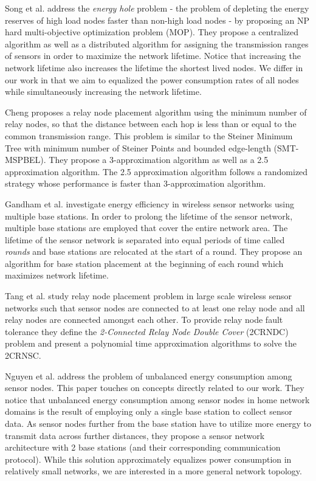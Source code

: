 Song et al. \cite{Song2009} address the \textit{energy hole} problem - the problem of depleting the energy reserves of high load nodes faster than non-high load nodes - by proposing an NP hard multi-objective optimization problem (MOP). They propose a centralized algorithm as well as a distributed algorithm for assigning the transmission ranges of sensors in order to maximize the network lifetime. Notice that increasing the network lifetime also increases the lifetime the shortest lived nodes. We differ in our work in that we aim to equalized the power consumption rates of all nodes while simultaneously increasing the network lifetime.

Cheng \cite{RelaySensor} proposes a relay node placement algorithm using the minimum number of relay nodes, so that the distance between each hop is less than or equal to the common transmission range. This problem is similar to the Steiner Minimum Tree with minimum number of Steiner Points and bounded edge-length (SMT-MSPBEL). They propose a 3-approximation algorithm as well as a 2.5 approximation algorithm. The 2.5 approximation algorithm follows a randomized strategy whose performance is faster than 3-approximation algorithm.

Gandham et al. \cite{1495854} investigate energy efficiency in wireless sensor networks using multiple base stations. In order to prolong the lifetime of the sensor network, multiple base stations are employed that cover the entire network area. The lifetime of the sensor network is separated into equal periods of time called \textit{rounds} and base stations are relocated at the start of a round. They propose an algorithm for base station placement at the beginning of each round which maximizes network lifetime.

Tang et al. \cite{Tang2006490} study relay node placement problem in large scale wireless sensor networks such that sensor nodes are connected to at least one relay node and all relay nodes are connected amongst each other. To provide relay node fault tolerance they define the \textit{2-Connected Relay Node Double Cover} (2CRNDC) problem and present a polynomial time approximation algorithms to solve the 2CRNSC.

Nguyen et al. \cite{4351517} address the problem of unbalanced energy consumption among sensor nodes. This paper touches on concepts directly related to our work. They notice that unbalanced energy consumption among sensor nodes in home network domains is the result of employing only a single base station to collect sensor data. As sensor nodes further from the base station have to utilize more energy to transmit data across further distances, they propose a sensor network architecture with 2 base stations (and their corresponding communication protocol). While this solution approximately equalizes power consumption in relatively small networks, we are interested in a more general network topology.